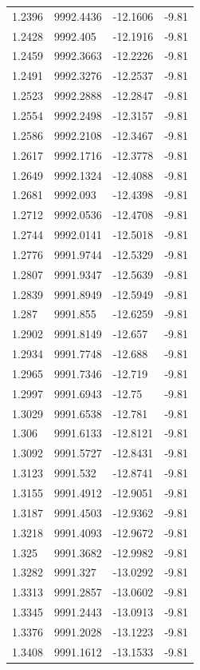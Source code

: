 \begin{table}[H]
\begin{tabular}{llll}
1.2396 & 9992.4436 & -12.1606 & -9.81 \\
1.2428 & 9992.405 & -12.1916 & -9.81 \\
1.2459 & 9992.3663 & -12.2226 & -9.81 \\
1.2491 & 9992.3276 & -12.2537 & -9.81 \\
1.2523 & 9992.2888 & -12.2847 & -9.81 \\
1.2554 & 9992.2498 & -12.3157 & -9.81 \\
1.2586 & 9992.2108 & -12.3467 & -9.81 \\
1.2617 & 9992.1716 & -12.3778 & -9.81 \\
1.2649 & 9992.1324 & -12.4088 & -9.81 \\
1.2681 & 9992.093 & -12.4398 & -9.81 \\
1.2712 & 9992.0536 & -12.4708 & -9.81 \\
1.2744 & 9992.0141 & -12.5018 & -9.81 \\
1.2776 & 9991.9744 & -12.5329 & -9.81 \\
1.2807 & 9991.9347 & -12.5639 & -9.81 \\
1.2839 & 9991.8949 & -12.5949 & -9.81 \\
1.287 & 9991.855 & -12.6259 & -9.81 \\
1.2902 & 9991.8149 & -12.657 & -9.81 \\
1.2934 & 9991.7748 & -12.688 & -9.81 \\
1.2965 & 9991.7346 & -12.719 & -9.81 \\
1.2997 & 9991.6943 & -12.75 & -9.81 \\
1.3029 & 9991.6538 & -12.781 & -9.81 \\
1.306 & 9991.6133 & -12.8121 & -9.81 \\
1.3092 & 9991.5727 & -12.8431 & -9.81 \\
1.3123 & 9991.532 & -12.8741 & -9.81 \\
1.3155 & 9991.4912 & -12.9051 & -9.81 \\
1.3187 & 9991.4503 & -12.9362 & -9.81 \\
1.3218 & 9991.4093 & -12.9672 & -9.81 \\
1.325 & 9991.3682 & -12.9982 & -9.81 \\
1.3282 & 9991.327 & -13.0292 & -9.81 \\
1.3313 & 9991.2857 & -13.0602 & -9.81 \\
1.3345 & 9991.2443 & -13.0913 & -9.81 \\
1.3376 & 9991.2028 & -13.1223 & -9.81 \\
1.3408 & 9991.1612 & -13.1533 & -9.81 \\

\end{tabular}
\end{table}
